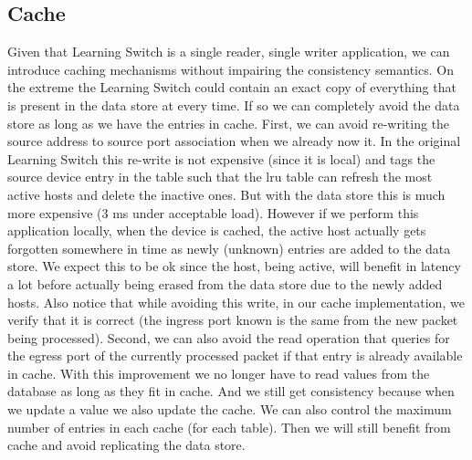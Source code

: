 \subsection{Cache}
\label{sec:ls:cache}
Given that Learning Switch is a single reader, single writer application, we can introduce caching mechanisms without impairing the consistency semantics. 
On the extreme the Learning Switch could contain an exact copy of everything that is present in the data store at every time. 
If so we can completely avoid the data store as long as we have the entries in cache.
First, we can avoid re-writing the source address to source port association when we already now it. 
In the original Learning Switch this re-write is not expensive (since it is local) and tags the source device  entry in the table such that the \gls{lru} table can refresh  the most  active hosts and delete the inactive ones.
But with the data store this is much more expensive (3 ms under acceptable load).
However if we perform this application locally, when the device is cached, the active host actually gets forgotten somewhere in time as newly (unknown) entries are added to the data store.  
We expect this to be ok since the host, being active, will benefit in latency a lot before actually being erased from the data store due to the newly added hosts. 
Also notice that while avoiding this write, in our cache implementation,  we verify that  it is correct (the ingress port known is the same from the new packet being processed).
Second, we can also avoid the read operation that queries for the egress port of the currently processed packet if that entry is already available in cache. 
With this improvement we no longer have to read values from the database as long as they fit in cache. And we still get consistency because when we update a value we also update the cache. 
We can also control the maximum number of entries in each cache (for each table). Then we will still benefit from cache and avoid replicating the data store.



